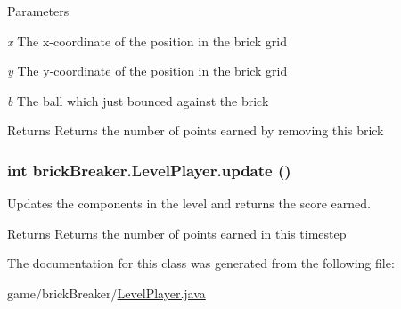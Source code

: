 \begin{DoxyParams}{Parameters}
\item[{\em x}]The x-\/coordinate of the position in the brick grid \item[{\em y}]The y-\/coordinate of the position in the brick grid \item[{\em b}]The ball which just bounced against the brick \end{DoxyParams}
\begin{DoxyReturn}{Returns}
Returns the number of points earned by removing this brick 
\end{DoxyReturn}
\hypertarget{classbrick_breaker_1_1_level_player_ad141c01fb30f6982c5b7932dd8ca901a}{
\subsubsection[{update}]{\setlength{\rightskip}{0pt plus 5cm}int brickBreaker.LevelPlayer.update ()}}
\label{classbrick_breaker_1_1_level_player_ad141c01fb30f6982c5b7932dd8ca901a}
Updates the components in the level and returns the score earned. \begin{DoxyReturn}{Returns}
Returns the number of points earned in this timestep 
\end{DoxyReturn}


The documentation for this class was generated from the following file:\begin{DoxyCompactItemize}
\item 
game/brickBreaker/\hyperlink{_level_player_8java}{LevelPlayer.java}\end{DoxyCompactItemize}
